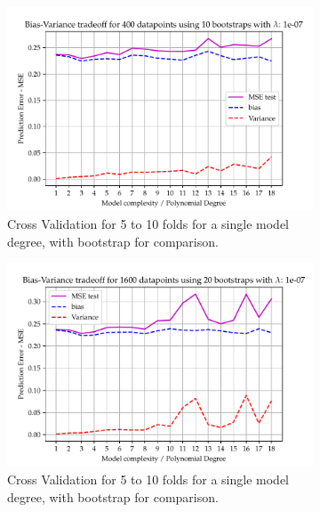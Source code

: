 \documentclass[11pt, a4paper]{article}
\begin{document}
\begin{figure}
  \centering
  \begin{subfigure}{0.49\textwidth}
      \centering
      \includegraphics[width=\textwidth]{figures/EX5_lasso_complexity_using_bootstrap_function_lmb200.pdf}
      \caption{\label{fig:boot_lasse_1}Cross Validation for 5 to 10 folds for a single model degree, with bootstrap for comparison.}
  \end{subfigure}
  \hfill
  \begin{subfigure}{0.49\textwidth}  
    \centering
    \includegraphics[width=\textwidth]{figures/EX5_lasso_complexity_using_bootstrap_function_lmb400.pdf}
    \caption{\label{fig:boot_lasso_2}Cross Validation for 5 to 10 folds for a single model degree, with bootstrap for comparison.}
  \end{subfigure}
  \hfill
  \begin{subfigure}{0.49\textwidth}  

\end{subfigure}
\end{figure}
\end{document}
